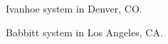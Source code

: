 \documentclass[twocolumn,10pt]{asme2ej}
\begin{document}
\begin{figure}[h!]
\begin{center}
\end{center}
\caption{Ivanhoe system in Denver, CO.}
\label{fig:ivanhoe}
\end{figure}


\begin{figure}[h!]
\begin{center}
\end{center}
\caption{Babbitt system in Los Angeles, CA.}
\label{fig:babbitt}
\end{figure}
\end{document}
